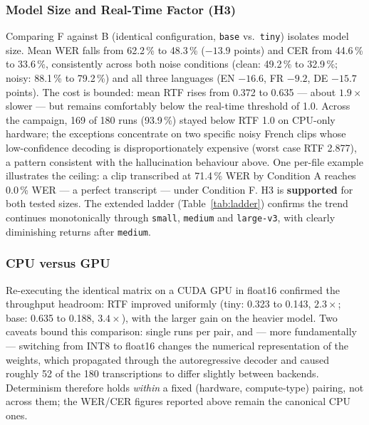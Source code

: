 \documentclass[12pt]{report}
\begin{document}
\subsubsection{Model Size and Real-Time Factor (H3)}
Comparing F against B (identical configuration, \texttt{base} vs.\ \texttt{tiny}) isolates model size. Mean WER falls from 62.2\,\% to 48.3\,\% ($-13.9$ points) and CER from 44.6\,\% to 33.6\,\%, consistently across both noise conditions (clean: 49.2\,\% to 32.9\,\%; noisy: 88.1\,\% to 79.2\,\%) and all three languages (EN $-16.6$, FR $-9.2$, DE $-15.7$ points). The cost is bounded: mean RTF rises from 0.372 to 0.635 --- about $1.9\times$ slower --- but remains comfortably below the real-time threshold of 1.0. Across the campaign, 169 of 180 runs (93.9\,\%) stayed below RTF 1.0 on CPU-only hardware; the exceptions concentrate on two specific noisy French clips whose low-confidence decoding is disproportionately expensive (worst case RTF 2.877), a pattern consistent with the hallucination behaviour above. One per-file example illustrates the ceiling: a clip transcribed at 71.4\,\% WER by Condition A reaches 0.0\,\% WER --- a perfect transcript --- under Condition F. H3 is \textbf{supported} for both tested sizes. The extended ladder (Table~\ref{tab:ladder}) confirms the trend continues monotonically through \texttt{small}, \texttt{medium} and \texttt{large-v3}, with clearly diminishing returns after \texttt{medium}.
\subsubsection{CPU versus GPU}
Re-executing the identical matrix on a CUDA GPU in float16 confirmed the throughput headroom: RTF improved uniformly (tiny: 0.323 to 0.143, $2.3\times$; base: 0.635 to 0.188, $3.4\times$), with the larger gain on the heavier model. Two caveats bound this comparison: single runs per pair, and --- more fundamentally --- switching from INT8 to float16 changes the numerical representation of the weights, which propagated through the autoregressive decoder and caused roughly 52 of the 180 transcriptions to differ slightly between backends. Determinism therefore holds \emph{within} a fixed (hardware, compute-type) pairing, not across them; the WER/CER figures reported above remain the canonical CPU ones.
\end{document}
